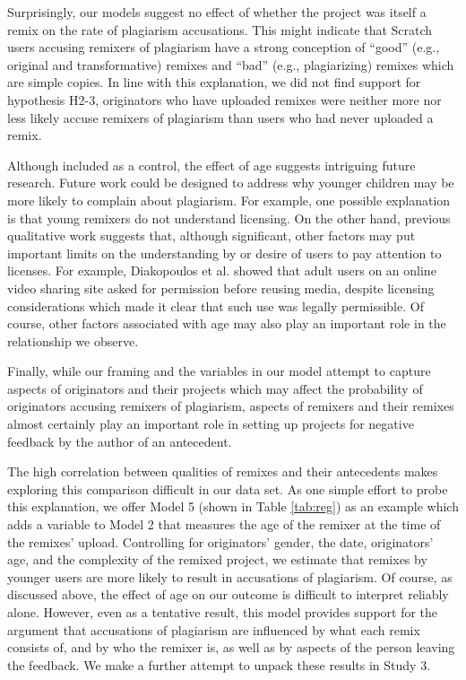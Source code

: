 Surprisingly, our models suggest no effect of whether the project was itself a
remix on the rate of plagiarism accusations. This might indicate that Scratch users accusing remixers of
plagiarism have a strong conception of ``good'' (e.g., original and
transformative) remixes and ``bad'' (e.g., plagiarizing) remixes which
are simple copies. In line with this explanation, we did not find
support for hypothesis H2-3, originators who have uploaded remixes were
neither more nor less likely accuse remixers of plagiarism than users
who had never uploaded a remix.

Although included as a control, the effect of age suggests intriguing
future research. Future work could be designed to address why
younger children may be more likely to complain about plagiarism.
For example, one possible explanation is that young remixers do not understand
licensing.  On the other hand, previous qualitative work suggests that,
although significant, other factors may put important limits on the
understanding by or desire of users to pay attention to licenses. For
example, Diakopoulos et al.  showed that adult users on an online video
sharing site asked for permission before reusing media, despite
licensing considerations which made it clear that such use was legally
permissible. Of course, other factors associated with age may also play
an important role in the relationship we observe.

Finally, while our framing and the
variables in our model attempt to capture aspects of originators and
their projects which may affect the probability of originators accusing
remixers of plagiarism, aspects of remixers and their remixes almost
certainly play an important role in setting up projects for negative
feedback by the author of an antecedent.

The high correlation between qualities of remixes and their antecedents
makes exploring this comparison difficult in our data set. As one simple
effort to probe this explanation, we offer Model 5 (shown in Table
\ref{tab:reg}) as an example which adds a variable to Model 2 that
measures the age of the remixer at the time of the remixes' upload.
Controlling for originators' gender, the date, originators' age, and the
complexity of the remixed project, we estimate that remixes by younger
users are more likely to result in accusations of plagiarism. Of
course, as discussed above, the effect of age on our outcome is
difficult to interpret reliably alone.  However, even as a tentative
result, this model provides support for the argument that accusations of
plagiarism are influenced by what each remix consists of, and by who the
remixer is, as well as by aspects of the person leaving the feedback. We
make a further attempt to unpack these results in Study 3.

